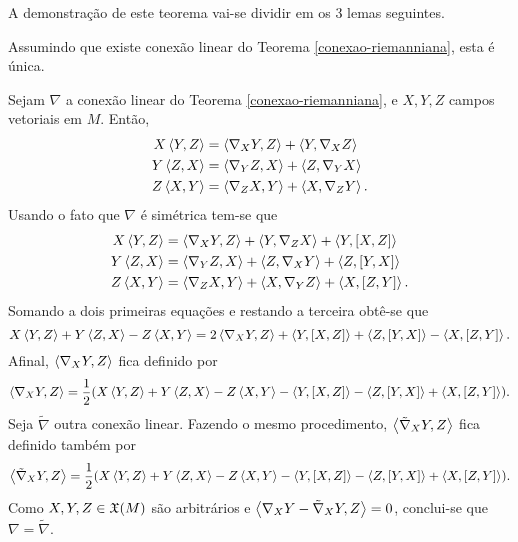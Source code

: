A demonstração de este teorema vai-se dividir em os 3 lemas seguintes.

\begin{lema}\label{conexao-riemanniana-lema-1}
	Assumindo que existe conexão linear do Teorema \ref{conexao-riemanniana}, esta é única.
\end{lema}

\begin{demonstracao}
	Sejam $\nabla$ a conexão linear do Teorema \ref{conexao-riemanniana}, e $X,Y,Z$ campos vetoriais em $M$. Então,
	\begin{align*}
		X \left\langle Y,Z \right\rangle &= \left\langle \nabla_X Y,Z \right\rangle + \left\langle Y,\nabla_X Z \right\rangle\\
		Y \left\langle Z,X \right\rangle &= \left\langle \nabla_Y Z,X \right\rangle + \left\langle Z,\nabla_Y X \right\rangle\\
		Z \left\langle X,Y \right\rangle &= \left\langle \nabla_Z X,Y \right\rangle + \left\langle X,\nabla_Z Y \right\rangle.
	\end{align*}
	Usando o fato que $\nabla$ é simétrica tem-se que
	\begin{align*}
	X \left\langle Y,Z \right\rangle &= \left\langle \nabla_X Y,Z \right\rangle + \left\langle Y,\nabla_Z X \right\rangle + \left\langle Y,\left[ X, Z \right] \right\rangle\\
	Y \left\langle Z,X \right\rangle &= \left\langle \nabla_Y Z,X \right\rangle + \left\langle Z,\nabla_X Y \right\rangle + \left\langle Z,\left[ Y, X \right] \right\rangle\\
	Z \left\langle X,Y \right\rangle &= \left\langle \nabla_Z X,Y \right\rangle + \left\langle X,\nabla_Y Z \right\rangle + \left\langle X,\left[ Z, Y \right] \right\rangle.
	\end{align*}
	Somando a dois primeiras equações e restando a terceira obtê-se que
	\begin{equation*}
		X \left\langle Y,Z \right\rangle + Y \left\langle Z,X \right\rangle - Z \left\langle X,Y \right\rangle = 2 \left\langle \nabla_X Y,Z \right\rangle + \left\langle Y,\left[ X, Z \right] \right\rangle + \left\langle Z,\left[ Y, X \right] \right\rangle - \left\langle X,\left[ Z, Y \right] \right\rangle.
	\end{equation*}
	Afinal, $\left\langle \nabla_X Y,Z \right\rangle$ fica definido por
	\begin{equation}\label{eq:conexao-riemanniana-lema-1-eq-a}
		\left\langle \nabla_X Y,Z \right\rangle = \frac{1}{2} ( X \left\langle Y,Z \right\rangle + Y \left\langle Z,X \right\rangle - Z \left\langle X,Y \right\rangle - \left\langle Y,\left[ X, Z \right] \right\rangle - \left\langle Z,\left[ Y, X \right] \right\rangle + \left\langle X,\left[ Z, Y \right] \right\rangle ).
	\end{equation}
	Seja $\tilde{\nabla}$ outra conexão linear. Fazendo o mesmo procedimento, $\left\langle \tilde{\nabla}_X Y,Z \right\rangle$ fica definido também por
	\begin{equation*}
	\left\langle \tilde{\nabla}_X Y,Z \right\rangle = \frac{1}{2} ( X \left\langle Y,Z \right\rangle + Y \left\langle Z,X \right\rangle - Z \left\langle X,Y \right\rangle - \left\langle Y,\left[ X, Z \right] \right\rangle - \left\langle Z,\left[ Y, X \right] \right\rangle + \left\langle X,\left[ Z, Y \right] \right\rangle ).
	\end{equation*}
	Como $X,Y,Z \in \mathfrak{X}(M)$ são arbitrários e $ \left\langle \nabla_X Y - \tilde{\nabla}_X Y,Z \right\rangle = 0 $, conclui-se que $ \nabla = \tilde{\nabla} $.
\end{demonstracao}

